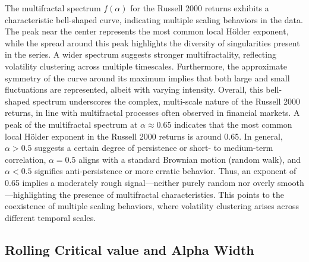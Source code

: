 \documentclass[11pt]{extarticle}
\begin{document}
\FloatBarrier

The multifractal spectrum $f(\alpha)$ for the Russell 2000 returns exhibits a characteristic bell-shaped curve,
indicating multiple scaling behaviors in the data. The peak near the center represents the most common local Hölder
exponent, while the spread around this peak highlights the diversity of singularities present in the series. A wider
spectrum suggests stronger multifractality, reflecting volatility clustering across multiple timescales. Furthermore,
the approximate symmetry of the curve around its maximum implies that both large and small fluctuations are represented,
albeit with varying intensity. Overall, this bell-shaped spectrum underscores the complex, multi-scale nature of the
Russell 2000 returns, in line with multifractal processes often observed in financial markets.
A peak of the multifractal spectrum at $\alpha \approx 0.65$ indicates that the most common local Hölder exponent
in the Russell 2000 returns is around 0.65. In general, $\alpha > 0.5$ suggests a certain degree of persistence or
short- to medium-term correlation, $\alpha = 0.5$ aligns with a standard Brownian motion (random walk),
and $\alpha < 0.5$ signifies anti-persistence or more erratic behavior. Thus, an exponent of 0.65 implies a
moderately rough signal—neither purely random nor overly smooth—highlighting the presence of multifractal characteristics.
This points to the coexistence of multiple scaling behaviors, where volatility clustering arises across different temporal scales.

\subsection{Rolling Critical value and Alpha Width}
\end{document}
